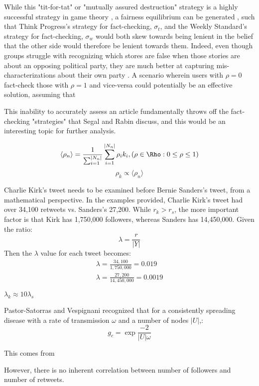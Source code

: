 While this "tit-for-tat" or "mutually assured destruction" strategy is a highly successful strategy in game theory \citep{segal2007tit}, a fairness equilibrium can be generated \citep{rabin1993incorporating}, such that Think Progress's strategy for fact-checking, $\sigma_t$, and the Weekly Standard's strategy for fact-checking, $\sigma_w$ would both skew towards being lenient in the belief that the other side would therefore be lenient towards them. Indeed, even though groups struggle with recognizing which stores are false when those stories are about an opposing political party, they are much better at capturing mis-characterizations about their own party \citep{pennycook2019lazy}. A scenario wherein users with $\rho = 0$ fact-check those with $\rho = 1$ and vice-versa could potentially be an effective solution, assuming that 

This inability to accurately assess an article fundamentally throws off the fact-checking "strategies" that Segal and Rabin discuss, and this would be an interesting topic for further analysis.





 \begin{equation}
    \label{ech chamber}
        \langle \rho_n \rangle = \frac{1}{\sum_{i=1}^{|N_n|}}\sum_{i=1}^{|N_n|}{\rho_i}{k_i}, (\rho \in \Rho: 0 \leq \rho \leq 1) 
 \end{equation}
 \begin{equation}
    \label{leaningproportionaltonetwork}
        \rho_k \propto \langle \rho_n \rangle
 \end{equation}
 
 
 
 
Charlie Kirk's tweet needs to be examined before Bernie Sanders's tweet, from a mathematical perspective. In the examples provided, Charlie Kirk's tweet had over 34,100 retweets vs. Sanders's 27,200. While $r_k > r_s$, the more important factor is that Kirk has 1,750,000 followers, whereas Sanders has 14,450,000. Given the ratio:
\begin{equation}
\label{retweetsperfollower}
    \lambda = \frac{r}{|Y|}
\end{equation}
Then the $\lambda$ value for each tweet becomes:
\begin{equation}
    \begin{split}
        \lambda = \frac{34,100}{1,750,000}=0.019 \\
        \lambda = \frac{27,200}{14,450,000}=0.0019
    \end{split}
\end{equation}

$\lambda_k \approx 10\lambda_s$


Pastor-Satorras and Vespignani recognized that for a consistently spreading disease with a rate of transmission $\omega$ and a number of nodes $|U|$,:
  \begin{equation}
    g_c = \exp{\frac{-2}{|U|\omega}}
\end{equation}

This comes from 

However, there is no inherent correlation between number of followers and number of retweets. 